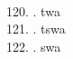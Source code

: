\begin{tabbing}
\egroup  \\
120.	.	\> twa		\> \bgroup\tibetan \def\u#1{\vtop{\baselineskip0pt\hbox{#1}\hbox{\tibsp\char123}}}\parindent=0pt \newbox\fillerbox\setbox\fillerbox\hbox{\vrule height0.4cm depth0.4cm width0pt}\def\filler{\copy\fillerbox} \filler\tibsp{}\tenrm\ \tibetan
\egroup  \\
121.	.	\> tswa		\> \bgroup\tibetan \def\u#1{\vtop{\baselineskip0pt\hbox{#1}\hbox{\tibsp\char123}}}\parindent=0pt \newbox\fillerbox\setbox\fillerbox\hbox{\vrule height0.4cm depth0.4cm width0pt}\def\filler{\copy\fillerbox} \filler\tibsp{}\tenrm\ \tibetan
\egroup  \\
122.	.	\> swa		\> \bgroup\tibetan \def\u#1{\vtop{\baselineskip0pt\hbox{#1}\hbox{\tibsp\char123}}}\parindent=0pt \newbox\fillerbox\setbox\fillerbox\hbox{\vrule height0.4cm depth0.4cm width0pt}\def\filler{\copy\fillerbox} \filler\tibsp{}\tenrm\ \tibetan
\egroup  \\
\end{tabbing}

